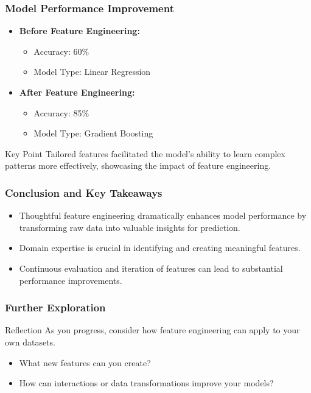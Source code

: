 \documentclass[aspectratio=169]{beamer}
\begin{document}
\begin{frame}[fragile]
    \frametitle{Model Performance Improvement}
    \begin{itemize}
        \item \textbf{Before Feature Engineering:}
            \begin{itemize}
                \item Accuracy: 60\%
                \item Model Type: Linear Regression 
            \end{itemize}
        \item \textbf{After Feature Engineering:}
            \begin{itemize}
                \item Accuracy: 85\%
                \item Model Type: Gradient Boosting 
            \end{itemize}
    \end{itemize}
    \begin{block}{Key Point}
        Tailored features facilitated the model's ability to learn complex patterns more effectively, showcasing the impact of feature engineering.
    \end{block}
\end{frame}

\begin{frame}[fragile]
    \frametitle{Conclusion and Key Takeaways}
    \begin{itemize}
        \item Thoughtful feature engineering dramatically enhances model performance by transforming raw data into valuable insights for prediction.
        \item Domain expertise is crucial in identifying and creating meaningful features.
        \item Continuous evaluation and iteration of features can lead to substantial performance improvements.
    \end{itemize}
\end{frame}

\begin{frame}[fragile]
    \frametitle{Further Exploration}
    \begin{block}{Reflection}
        As you progress, consider how feature engineering can apply to your own datasets.
        \begin{itemize}
            \item What new features can you create?
            \item How can interactions or data transformations improve your models?
        \end{itemize}
    \end{block}
\end{frame}
\end{document}
